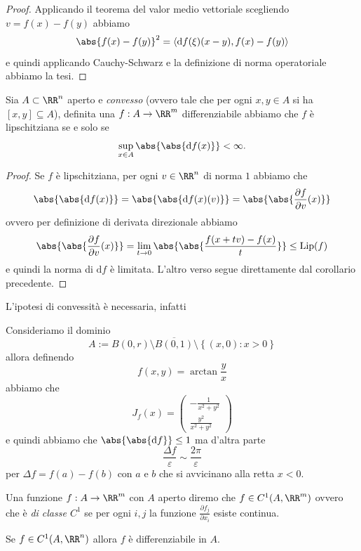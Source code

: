 \documentclass[11pt]{scrartcl}
\newcommand{\dif}{\text{d}}
\begin{document}
	\begin{proof}
		Applicando il teorema del valor medio vettoriale scegliendo $v=f(x)-f(y)$ abbiamo
		$$\abs{f(x)-f(y)}^2=\langle \dif f(\xi)(x-y),f(x)-f(y)\rangle$$
		e quindi applicando Cauchy-Schwarz e la definizione di norma operatoriale abbiamo la tesi.
	\end{proof}
	\begin{corollary}
		Sia $A\subset \RR^n$ aperto e \textit{convesso} (ovvero tale che per ogni $x,y\in A$ si ha $[x,y]\subseteq A$), definita una $f:A\to\RR^m$ differenziabile abbiamo che $f$ è lipschitziana se e solo se 
		$$\sup_{x\in A}\abs{\abs{\dif f(x)}}<\infty.$$
	\end{corollary}
	\begin{proof}
		Se $f$ è lipschitziana, per ogni $v\in \RR^n$ di norma $1$ abbiamo che
		$$\abs{\abs{\dif f(x)}}=\abs{\abs{\dif f(x)(v)}}=\abs{\abs{\frac{\partial f}{\partial v}(x)}}$$
		ovvero per definizione di derivata direzionale abbiamo
		$$\abs{\abs{\frac{\partial f}{\partial v}(x)}}=\lim_{t\to 0} \abs{\abs{\frac{f(x+tv)-f(x)}{t}}}\le \text{Lip}(f)$$
		e quindi la norma di $\dif f$ è limitata. L'altro verso segue direttamente dal corollario precedente.
	\end{proof}
	L'ipotesi di convessità è necessaria, infatti
	\begin{example}
		Consideriamo il dominio
		$$A:=B(0,r)\setminus \overline{B(0,1)}\setminus \left\{(x,0):x>0\right\}$$
		allora definendo
		$$f(x,y)=\arctan \frac{y}{x}$$
		abbiamo che 
		$$
		J_f(x)=
		\begin{pmatrix}
			-\frac{1}{x^2+y^2} \\
			\frac{y^2}{x^2+y^2}
		\end{pmatrix}
		$$
		e quindi abbiamo che $\abs{\abs{\dif f}}\le 1$ ma d'altra parte
		$$\frac{\Delta f}{\varepsilon}\sim \frac{2\pi}{\varepsilon}$$
		per $\Delta f=f(a)-f(b)$ con $a $ e $b$ che si avvicinano alla retta $x<0$.
	\end{example}
	\begin{definition}
		Una funzione $f:A\to\RR^m$ con $A$ aperto diremo che $f\in C^1(A,\RR^m)$ ovvero che è \textit{di classe $C^1$} se per ogni $i,j$ la funzione 
		$\frac{\partial f_j}{\partial x_i}$
		esiste continua.
	\end{definition}
	\begin{theorem}
		Se $f\in C^1(A,\RR^n)$ allora $f$ è differenziabile in $A$.
	\end{theorem}
\end{document}

